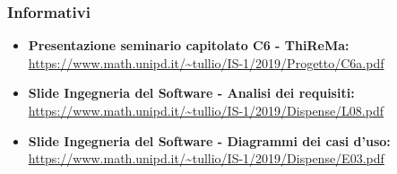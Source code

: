 		\subsubsection{Informativi}
			\begin{itemize}
				\item \textbf{Presentazione seminario capitolato C6 - ThiReMa: }\url{https://www.math.unipd.it/~tullio/IS-1/2019/Progetto/C6a.pdf}
				\item \textbf{Slide Ingegneria del Software - Analisi dei requisiti: }\url{https://www.math.unipd.it/~tullio/IS-1/2019/Dispense/L08.pdf}
				\item \textbf{Slide Ingegneria del Software - Diagrammi dei casi d'uso: }\url{https://www.math.unipd.it/~tullio/IS-1/2019/Dispense/E03.pdf} 
			\end{itemize}
 